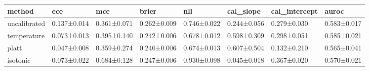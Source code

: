 \begin{tabular}{llllllll}
\toprule
method & ece & mce & brier & nll & cal\_slope & cal\_intercept & auroc \\
\midrule
uncalibrated & 0.137±0.014 & 0.361±0.071 & 0.262±0.009 & 0.746±0.022 & 0.244±0.056 & 0.279±0.030 & 0.583±0.017 \\
temperature & 0.073±0.013 & 0.395±0.140 & 0.242±0.006 & 0.678±0.012 & 0.598±0.309 & 0.298±0.051 & 0.585±0.021 \\
platt & 0.047±0.008 & 0.359±0.274 & 0.240±0.006 & 0.674±0.013 & 0.607±0.504 & 0.132±0.210 & 0.565±0.041 \\
isotonic & 0.073±0.022 & 0.684±0.128 & 0.247±0.006 & 0.930±0.098 & 0.045±0.018 & 0.367±0.020 & 0.570±0.021 \\
\bottomrule
\end{tabular}
